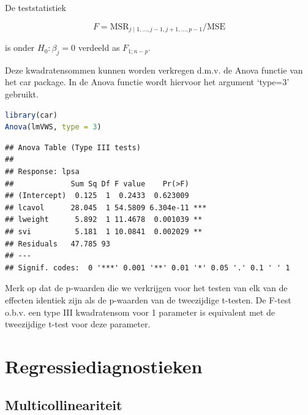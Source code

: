 \documentclass[
  12pt,dutch,coursenotes]{book}
\theoremstyle{definition}
\theoremstyle{definition}
\theoremstyle{definition}
\theoremstyle{definition}
\theoremstyle{remark}
\begin{document}
De teststatistiek

\[
F=\text{MSR}_{j \mid 1,\ldots, j-1,j+1,\ldots, p-1}/\text{MSE}
\]

is onder \(H_0:\beta_j=0\) verdeeld as \(F_{1;n-p}\).

Deze kwadratensommen kunnen worden verkregen d.m.v. de Anova functie van het car package. In de Anova functie wordt hiervoor het argument `type=3' gebruikt.

\begin{lstlisting}[language=R]
library(car)
Anova(lmVWS, type = 3)
\end{lstlisting}

\begin{lstlisting}
## Anova Table (Type III tests)
## 
## Response: lpsa
##             Sum Sq Df F value    Pr(>F)    
## (Intercept)  0.125  1  0.2433  0.623009    
## lcavol      28.045  1 54.5809 6.304e-11 ***
## lweight      5.892  1 11.4678  0.001039 ** 
## svi          5.181  1 10.0841  0.002029 ** 
## Residuals   47.785 93                      
## ---
## Signif. codes:  0 '***' 0.001 '**' 0.01 '*' 0.05 '.' 0.1 ' ' 1
\end{lstlisting}

Merk op dat de p-waarden die we verkrijgen voor het testen van elk van de effecten identiek zijn als de p-waarden van de tweezijdige t-testen.
De F-test o.b.v. een type III kwadratensom voor 1 parameter is equivalent met de tweezijdige t-test voor deze parameter.

\hypertarget{regressiediagnostieken}{%
\section{Regressiediagnostieken}\label{regressiediagnostieken}}

\hypertarget{multicollineariteit}{%
\subsection{Multicollineariteit}\label{multicollineariteit}}
\end{document}
